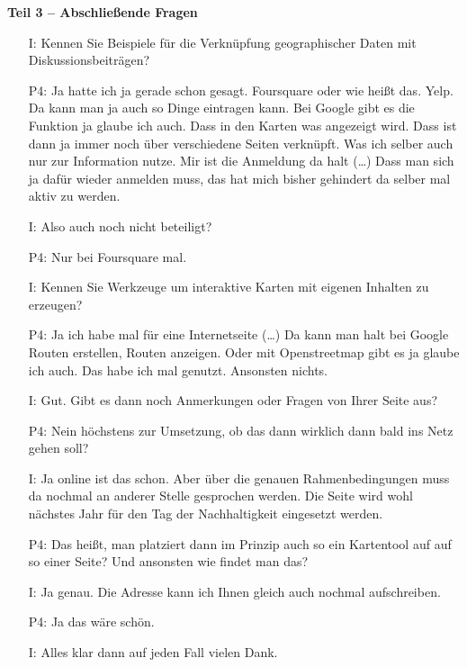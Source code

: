 \textbf{Teil 3 -- Abschlie{\ss}ende Fragen}
\begin{itemize}
    \item[I:] Kennen Sie Beispiele f{\"u}r die Verkn{\"u}pfung geographischer Daten mit Diskussionsbeitr{\"a}gen?
    \item[P4:] Ja hatte ich ja gerade schon gesagt. Foursquare oder wie hei{\ss}t das. Yelp. Da kann man ja auch so Dinge eintragen kann. Bei Google gibt es die Funktion ja glaube ich auch. Dass in den Karten was angezeigt wird. Dass ist dann ja immer noch {\"u}ber verschiedene Seiten verkn{\"u}pft. Was ich selber auch nur zur Information nutze. Mir ist die Anmeldung da halt (\dots) Dass man sich ja daf{\"u}r wieder anmelden muss, das hat mich bisher gehindert da selber mal aktiv zu werden.
    \item[I:] Also auch noch nicht beteiligt?
    \item[P4:] Nur bei Foursquare mal.
    \item[I:] Kennen Sie Werkzeuge um interaktive Karten mit eigenen Inhalten zu erzeugen?
    \item[P4:] Ja ich habe mal f{\"u}r eine Internetseite (\dots) Da kann man halt bei Google Routen erstellen, Routen anzeigen. Oder mit Openstreetmap gibt es ja glaube ich auch. Das habe ich mal genutzt. Ansonsten nichts.
    \item[I:] Gut. Gibt es dann noch Anmerkungen oder Fragen von Ihrer Seite aus?
    \item[P4:] Nein h{\"o}chstens zur Umsetzung, ob das dann wirklich dann bald ins Netz gehen soll?
    \item[I:] Ja online ist das schon. Aber {\"u}ber die genauen Rahmenbedingungen muss da nochmal an anderer Stelle gesprochen werden. Die Seite wird wohl n{\"a}chstes Jahr f{\"u}r den Tag der Nachhaltigkeit eingesetzt werden.
    \item[P4:] Das hei{\ss}t, man platziert dann im Prinzip auch so ein Kartentool auf auf so einer Seite? Und ansonsten wie findet man das?
    \item[I:] Ja genau. Die Adresse kann ich Ihnen gleich auch nochmal aufschreiben.
    \item[P4:] Ja das w{\"a}re sch{\"o}n.
    \item[I:] Alles klar dann auf jeden Fall vielen Dank.
\end{itemize}